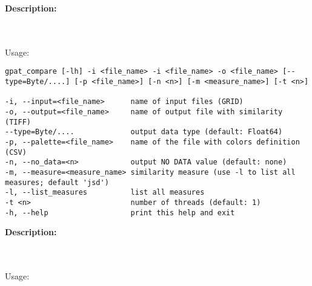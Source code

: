 






{\bf Description:}

{}
\\\\
Usage:

\begin{minipage}{\linewidth}
\begin{lstlisting}
gpat_compare [-lh] -i <file_name> -i <file_name> -o <file_name> [--type=Byte/....] [-p <file_name>] [-n <n>] [-m <measure_name>] [-t <n>]

-i, --input=<file_name>      name of input files (GRID)
-o, --output=<file_name>     name of output file with similarity (TIFF)
--type=Byte/....             output data type (default: Float64)
-p, --palette=<file_name>    name of the file with colors definition (CSV)
-n, --no_data=<n>            output NO DATA value (default: none)
-m, --measure=<measure_name> similarity measure (use -l to list all measures; default 'jsd')
-l, --list_measures          list all measures
-t <n>                       number of threads (default: 1)
-h, --help                   print this help and exit
\end{lstlisting}
\end{minipage}









{\bf Description:}

{}
\\\\
Usage:

